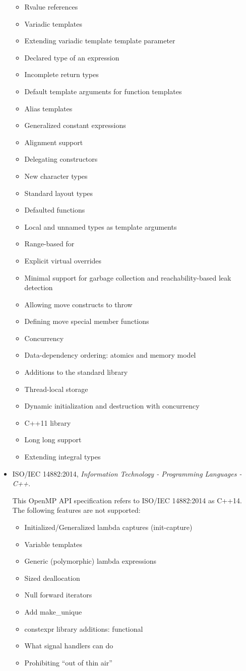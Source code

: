 \begin{itemize}
\begin{itemize}
\item Rvalue references
\item Variadic templates
\item Extending variadic template template parameter
\item Declared type of an expression
\item Incomplete return types
\item Default template arguments for function templates
\item Alias templates
\item Generalized constant expressions
\item Alignment support
\item Delegating constructors
\item New character types
\item Standard layout types
\item Defaulted functions
\item Local and unnamed types as template arguments
\item Range-based for
\item Explicit virtual overrides
\item Minimal support for garbage collection and reachability-based leak detection
\item Allowing move constructs to throw
\item Defining move special member functions
\item Concurrency
\item Data-dependency ordering: atomics and memory model
\item Additions to the standard library
\item Thread-local storage
\item Dynamic initialization and destruction with concurrency
\item C++11 library
\item Long long support
\item Extending integral types
\end{itemize}

\item ISO/IEC 14882:2014, \textsl{Information Technology - Programming Languages - C++}.

This OpenMP API specification refers to ISO/IEC 14882:2014 as
C++14. The following features are not supported:

\begin{itemize}
\item Initialized/Generalized lambda captures (init-capture)
\item Variable templates
\item Generic (polymorphic) lambda expressions
\item Sized deallocation
\item Null forward iterators
\item Add make\_unique
\item constexpr library additions: functional
\item What signal handlers can do
\item Prohibiting ``out of thin air''
\end{itemize}


\end{itemize}
